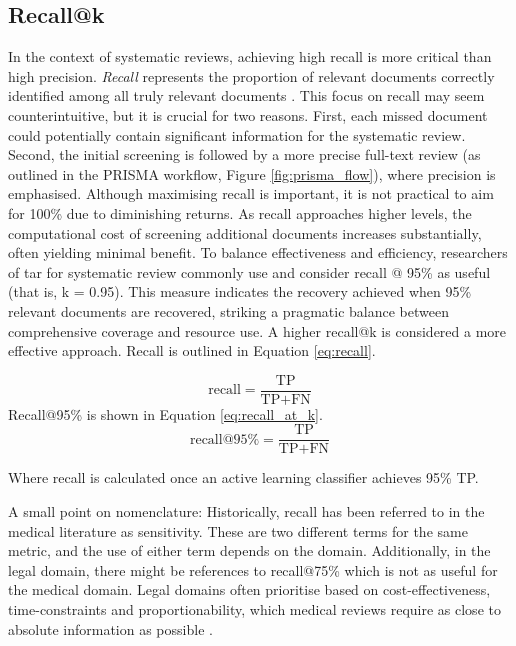 \documentclass[10pt,oneside]{book}
\begin{document}
\subsection{Recall@k}
In the context of systematic reviews, achieving high recall is more critical than high precision. \emph{Recall} represents the proportion of relevant documents correctly identified among all truly relevant documents \cite{omara-eves_using_2015}. This focus on recall may seem counterintuitive, but it is crucial for two reasons. First, each missed document could potentially contain significant information for the systematic review. Second, the initial screening is followed by a more precise full-text review (as outlined in the PRISMA workflow, Figure \ref{fig:prisma_flow}), where precision is emphasised.
Although maximising recall is important, it is not practical to aim for 100\% due to diminishing returns. As recall approaches higher levels, the computational cost of screening additional documents increases substantially, often yielding minimal benefit. To balance effectiveness and efficiency, researchers of \gls*{tar} for systematic review commonly use and consider recall @ 95\% as useful (that is, k = 0.95). This measure indicates the recovery achieved when 95\% relevant documents are recovered, striking a pragmatic balance between comprehensive coverage and resource use. A higher recall@k is considered a more effective approach.
Recall is outlined in Equation \ref{eq:recall}.

\begin{equation}
\text{recall} = \frac{\text{TP}}{\text{TP} + \text{FN}}
\label{eq:recall}
\end{equation}
Recall@95\% is shown in Equation \ref{eq:recall_at_k}.
\begin{equation}
\text{recall@95\%} = \frac{\text{TP}}{\text{TP} + \text{FN}}
\label{eq:recall_at_k}
\end{equation}

Where recall is calculated once an active learning classifier achieves 95\% TP.

A small point on nomenclature: Historically, recall has been referred to in the medical literature as sensitivity. These are two different terms for the same metric, and the use of either term depends on the domain. Additionally, in the legal domain, there might be references to recall@75\% which is not as useful for the medical domain. Legal domains often prioritise based on cost-effectiveness, time-constraints and proportionability, which medical reviews require as close to absolute information as possible \cite{tsafnat_systematic_2014}.
\end{document}

